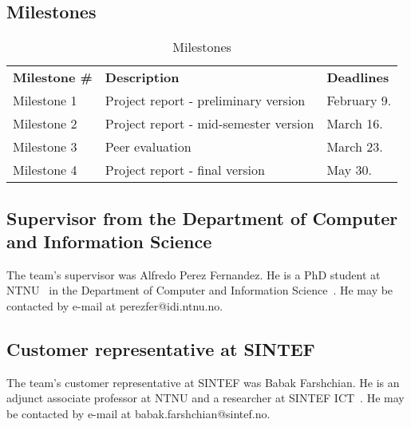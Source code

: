 \subsection{Milestones}
\begin{table}[H]
\centering
{}
\begin{tabular}{|l|l|l|}
\hline
\textbf{Milestone \#} & \textbf{Description} & \textbf{Deadlines}\\
Milestone 1& Project report - preliminary version & February 9. \\
Milestone 2 & Project report - mid-semester version & March 16.  \\
Milestone 3 & Peer evaluation & March 23.  \\
 Milestone 4 & Project report - final version & May 30.\\\hline
\end{tabular}
\caption{Milestones}
\end{table}

\subsection{Supervisor from the Department of Computer and Information Science}
The team's supervisor was Alfredo Perez Fernandez. He is a PhD student at NTNU~\cite{ntnu} in the Department of Computer and Information Science~\cite{idi}. He may be contacted by e-mail at perezfer@idi.ntnu.no.

\subsection{Customer representative at SINTEF}
The team's customer representative at SINTEF was Babak Farshchian. He is an adjunct associate professor at NTNU and a researcher at SINTEF ICT~\cite{sintefict}. He may be contacted by e-mail at babak.farshchian@sintef.no.
